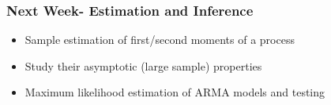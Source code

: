 \documentclass{beamer}
\begin{document}
			\begin{frame}
				\frametitle{Next Week- Estimation and Inference}
				\normalsize
				\begin{itemize}
					

			
			
			\vspace{25pt}
					\item[] Sample estimation of first/second moments of a process
						\vspace{25pt}
						\item[] Study their asymptotic (large sample) properties
				
				
					\vspace{25pt}
					\item[] Maximum likelihood estimation of ARMA models and testing
					
					
				\end{itemize}
			\end{frame}
		
		
		
		
\end{document}
